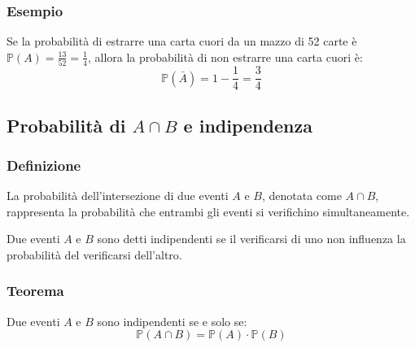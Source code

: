 \documentclass{article}
\begin{document}
\begin{figure}[ht!]
    \begin{center}
    \end{center}
    \end{figure}

\subsubsection{Esempio}
Se la probabilità di estrarre una carta cuori da un mazzo di 52 carte è \(\mathbb{P}(A) = \frac{13}{52} = \frac{1}{4}\), allora la probabilità di non estrarre una carta cuori è:
\[
    \mathbb{P}(\bar{A}) = 1 - \frac{1}{4} = \frac{3}{4}
\]

\newpage
\subsection{Probabilità di \(A \cap B\) e indipendenza}

\subsubsection{Definizione}
La probabilità dell'intersezione di due eventi \(A\) e \(B\), denotata come \(A \cap B\),
rappresenta la probabilità che entrambi gli eventi si verifichino simultaneamente.

Due eventi \(A\) e \(B\) sono detti indipendenti se il verificarsi di uno non influenza la
probabilità del verificarsi dell'altro.

\subsubsection{Teorema}
Due eventi \(A\) e \(B\) sono indipendenti se e solo se:
\[
    \mathbb{P}(A \cap B) = \mathbb{P}(A) \cdot \mathbb{P}(B)
\]
\end{document}
